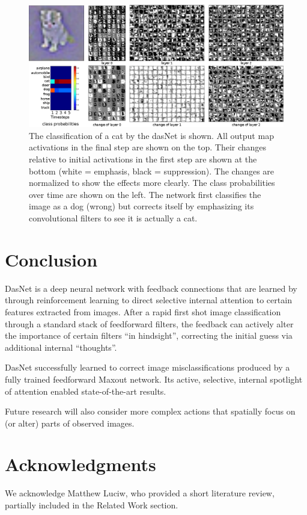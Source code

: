 \begin{figure}[t]
\centering
\includegraphics[width=\linewidth]{catdog.eps}
\caption{The classification of a cat by the dasNet is shown. All
  output map activations in the final step are shown on the top. Their
  changes relative to initial activations in the first step
  are shown at the bottom (white = emphasis, black = suppression). The
  changes are normalized to show the effects more
  clearly. The class probabilities over time are shown on the left. The
  network first classifies the image as a dog (wrong) but corrects
  itself by emphasizing its convolutional filters to see it is actually a cat.}
\label{fig:details1}
\end{figure}


\section{Conclusion}
DasNet is a deep neural network with feedback connections that are
learned by through reinforcement learning to direct selective internal
attention to certain features extracted from images. After a rapid
first shot image classification through a standard stack of
feedforward filters, the feedback can actively alter the importance of
certain filters ``in hindsight'', correcting the initial guess via
additional internal ``thoughts''.

DasNet successfully learned to correct image misclassifications
produced by a fully trained feedforward Maxout network. Its active,
selective, internal spotlight of attention enabled state-of-the-art
results.

Future research will also consider more complex actions that spatially
focus on (or alter) parts of observed images.

\section*{Acknowledgments} 
We acknowledge Matthew Luciw, who provided a short literature review, partially included in the Related Work section.

